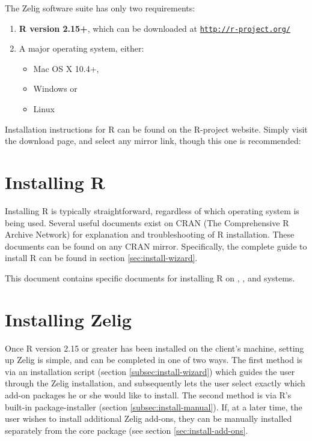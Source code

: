 The Zelig software suite has only two requirements: 

\begin{enumerate}

  \item {\bf R version 2.15+}, which can be downloaded at \href{http://www.r-project.org/}{\tt http://r-project.org/}

  \item A major operating system, either:

    \begin{itemize}
      \item Mac OS X 10.4+,
      \item Windows or
      \item Linux
    \end{itemize}

\end{enumerate}

Installation instructions for R can be found on the R-project website. Simply
visit the download page, and select any mirror link, though this one is
recommended:

\CranMirror



\section{Installing R}
\label{sec:install-r}

Installing R is typically straightforward, regardless of which operating
system is being used. Several useful documents exist on CRAN
(The Comprehensive R Archive Network) for explanation and troubleshooting of R
installation. These documents can be found on any CRAN mirror. Specifically,
the complete guide to install R can be found in section
\ref{sec:install-wizard}.

\InstallInstructionsHref

This document contains specific documents for installing R on \MacInstallHref,
\WindowsInstallHref, and \UnixInstallHref systems.



\section{Installing Zelig}
\label{sec:install-zelig}

Once R version 2.15 or greater has been installed on the client's machine,
setting up Zelig is simple, and can be completed in one of two ways. The first
method is via an installation script (section \ref{subsec:install-wizard}) which
guides the user through the Zelig installation, and subsequently lets the user
select exactly which add-on packages he or she would like to install. The second
method is via R's built-in package-installer (section
\ref{subsec:install-manual}). If, at a later time, the user wishes to install
additional Zelig add-ons, they can be manually installed separately from the
core package (see section \ref{sec:install-add-ons}.

